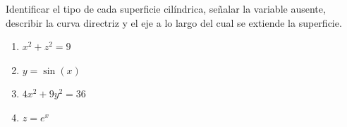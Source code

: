 Identificar el tipo de cada superficie cilíndrica, señalar la variable ausente, describir la curva directriz y el eje a lo largo del cual se extiende la superficie.
\begin{enumerate}
    \item $x^2 + z^2 = 9$
    \item $y = \sin(x)$
    \item $4x^2 + 9y^2 = 36$
    \item $z = e^x$
\end{enumerate}